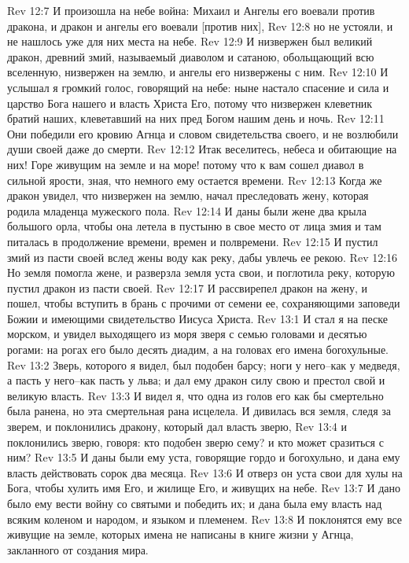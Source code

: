 Rev 12:7  И произошла на небе война: Михаил и Ангелы его воевали против дракона, и дракон и ангелы его воевали [против них],
Rev 12:8  но не устояли, и не нашлось уже для них места на небе.
Rev 12:9  И низвержен был великий дракон, древний змий, называемый диаволом и сатаною, обольщающий всю вселенную, низвержен на землю, и ангелы его низвержены с ним.
Rev 12:10  И услышал я громкий голос, говорящий на небе: ныне настало спасение и сила и царство Бога нашего и власть Христа Его, потому что низвержен клеветник братий наших, клеветавший на них пред Богом нашим день и ночь.
Rev 12:11  Они победили его кровию Агнца и словом свидетельства своего, и не возлюбили души своей даже до смерти.
Rev 12:12  Итак веселитесь, небеса и обитающие на них! Горе живущим на земле и на море! потому что к вам сошел диавол в сильной ярости, зная, что немного ему остается времени.
Rev 12:13  Когда же дракон увидел, что низвержен на землю, начал преследовать жену, которая родила младенца мужеского пола.
Rev 12:14  И даны были жене два крыла большого орла, чтобы она летела в пустыню в свое место от лица змия и там питалась в продолжение времени, времен и полвремени.
Rev 12:15  И пустил змий из пасти своей вслед жены воду как реку, дабы увлечь ее рекою.
Rev 12:16  Но земля помогла жене, и разверзла земля уста свои, и поглотила реку, которую пустил дракон из пасти своей.
Rev 12:17  И рассвирепел дракон на жену, и пошел, чтобы вступить в брань с прочими от семени ее, сохраняющими заповеди Божии и имеющими свидетельство Иисуса Христа.
Rev 13:1  И стал я на песке морском, и увидел выходящего из моря зверя с семью головами и десятью рогами: на рогах его было десять диадим, а на головах его имена богохульные.
Rev 13:2  Зверь, которого я видел, был подобен барсу; ноги у него--как у медведя, а пасть у него--как пасть у льва; и дал ему дракон силу свою и престол свой и великую власть.
Rev 13:3  И видел я, что одна из голов его как бы смертельно была ранена, но эта смертельная рана исцелела. И дивилась вся земля, следя за зверем, и поклонились дракону, который дал власть зверю,
Rev 13:4  и поклонились зверю, говоря: кто подобен зверю сему? и кто может сразиться с ним?
Rev 13:5  И даны были ему уста, говорящие гордо и богохульно, и дана ему власть действовать сорок два месяца.
Rev 13:6  И отверз он уста свои для хулы на Бога, чтобы хулить имя Его, и жилище Его, и живущих на небе.
Rev 13:7  И дано было ему вести войну со святыми и победить их; и дана была ему власть над всяким коленом и народом, и языком и племенем.
Rev 13:8  И поклонятся ему все живущие на земле, которых имена не написаны в книге жизни у Агнца, закланного от создания мира.

